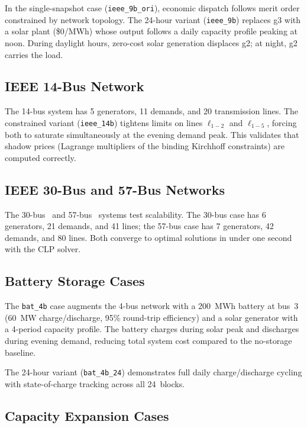 In the single-snapshot case (\texttt{ieee\_9b\_ori}), economic dispatch
follows merit order constrained by network topology.  The 24-hour variant
(\texttt{ieee\_9b}) replaces g3 with a solar plant (\$0/MWh) whose output
follows a daily capacity profile peaking at noon.  During daylight hours,
zero-cost solar generation displaces g2; at night, g2 carries the load.

\subsection{IEEE 14-Bus Network}
\label{sec:ieee14b}

The 14-bus system has 5 generators, 11 demands, and 20 transmission lines.
The constrained variant (\texttt{ieee\_14b}) tightens limits on lines
$\ell_{1-2}$ and $\ell_{1-5}$, forcing both to saturate simultaneously
at the evening demand peak.  This validates that shadow prices (Lagrange
multipliers of the binding Kirchhoff constraints) are computed correctly.

\subsection{IEEE 30-Bus and 57-Bus Networks}

The 30-bus~\cite{ieee30bus} and 57-bus~\cite{ieee57bus} systems test
scalability.  The 30-bus case has 6 generators, 21 demands, and 41 lines;
the 57-bus case has 7 generators, 42 demands, and 80 lines.  Both
converge to optimal solutions in under one second with the CLP solver.

\subsection{Battery Storage Cases}
\label{sec:bat_cases}

The \texttt{bat\_4b} case augments the 4-bus network with a 200~MWh
battery at bus~3 (60~MW charge/discharge, 95\% round-trip efficiency) and
a solar generator with a 4-period capacity profile.  The battery charges
during solar peak and discharges during evening demand, reducing total
system cost compared to the no-storage baseline.

The 24-hour variant (\texttt{bat\_4b\_24}) demonstrates full daily
charge/discharge cycling with state-of-charge tracking across all
24~blocks.

\subsection{Capacity Expansion Cases}
\label{sec:exp_cases}


